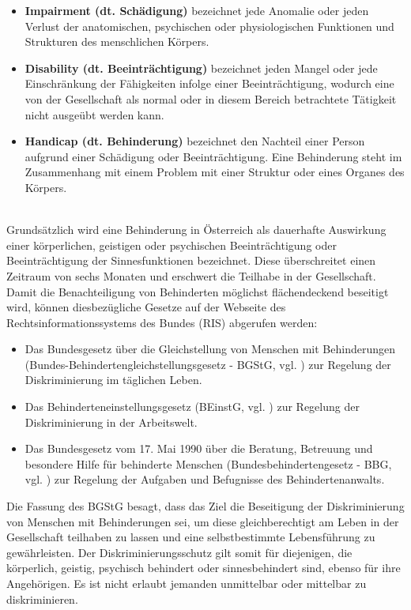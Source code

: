 \begin{itemize}
    \item \textbf{Impairment (dt. Schädigung)} bezeichnet jede Anomalie oder jeden Verlust der anatomischen, psychischen oder physiologischen Funktionen und Strukturen des menschlichen Körpers.
    \item \textbf{Disability (dt. Beeinträchtigung)} bezeichnet jeden Mangel oder jede Einschränkung der Fähigkeiten infolge einer Beeinträchtigung, wodurch eine von der Gesellschaft als normal oder in diesem Bereich betrachtete Tätigkeit nicht ausgeübt werden kann.
    \item \textbf{Handicap (dt. Behinderung)} bezeichnet den Nachteil einer Person aufgrund einer Schädigung oder Beeinträchtigung. Eine Behinderung steht im Zusammenhang mit einem Problem mit einer Struktur oder eines Organes des Körpers.
\end{itemize}

\mbox{}\\Grundsätzlich wird eine Behinderung in Österreich als dauerhafte Auswirkung einer körperlichen, geistigen oder psychischen Beeinträchtigung oder Beeinträchtigung der Sinnesfunktionen bezeichnet. Diese überschreitet einen Zeitraum von sechs Monaten und erschwert die Teilhabe in der Gesellschaft. Damit die Benachteiligung von Behinderten möglichst flächendeckend beseitigt wird, können diesbezügliche Gesetze auf der Webseite des Rechtsinformationssystems des Bundes (RIS) abgerufen werden:

\begin{itemize}
    \item Das Bundesgesetz über die Gleichstellung von Menschen mit Behinderungen (Bundes-Behindertengleichstellungsgesetz - BGStG, vgl. \cite{ris_bgstg_2020}) zur Regelung der Diskriminierung im täglichen Leben.
    \item Das Behinderteneinstellungsgesetz (BEinstG, vgl. \cite{ris_beinstg_2020}) zur Regelung der Diskriminierung in der Arbeitswelt.
    \item Das Bundesgesetz vom 17. Mai 1990 über die Beratung, Betreuung und besondere Hilfe für behinderte Menschen (Bundesbehindertengesetz - BBG, vgl. \cite{ris_bbg_2020}) zur Regelung der Aufgaben und Befugnisse des Behindertenanwalts.
\end{itemize}

Die Fassung des BGStG besagt, dass das Ziel die Beseitigung der Diskriminierung von Menschen mit Behinderungen sei, um diese gleichberechtigt am Leben in der Gesellschaft teilhaben zu lassen und eine selbstbestimmte Lebensführung zu gewährleisten. Der Diskriminierungsschutz gilt somit für diejenigen, die körperlich, geistig, psychisch behindert oder sinnesbehindert sind, ebenso für ihre Angehörigen. Es ist nicht erlaubt jemanden unmittelbar oder mittelbar zu diskriminieren.

